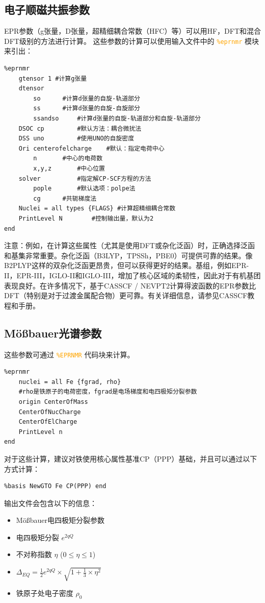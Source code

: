 \documentclass{ctexart}
\newcommand{\cmd}[1]{ \textcolor{orange}{\texttt{#1}} }
\begin{document}
	\subsection{电子顺磁共振参数} 
	EPR参数（g张量，D张量，超精细耦合常数（HFC）等）可以用HF，DFT和混合DFT级别的方法进行计算。
	这些参数的计算可以使用输入文件中的\cmd{\%eprnmr}模块来引出：
	\begin{lstlisting}
%eprnmr
	gtensor 1 #计算g张量
	dtensor 
		so		#计算d张量的自旋-轨道部分
		ss		#计算d张量的自旋-自旋部分 
		ssandso		#计算d张量的自旋-轨道部分和自旋-轨道部分
	DSOC cp 		#默认方法：耦合微扰法
	DSS uno 		#使用UNO的自旋密度
	Ori centerofelcharge	#默认：指定电荷中心
		n		#中心的电荷数
		x,y,z		#中心位置
	solver 			#指定解CP-SCF方程的方法 
		pople		#默认选项：polpe法
		cg		#共轭梯度法
	Nuclei = all types {FLAGS} #计算超精细耦合常数
	PrintLevel N    	#控制输出量，默认为2
end
	\end{lstlisting}
	
	注意：例如，在计算这些属性（尤其是使用DFT或杂化泛函）时，正确选择泛函和基集非常重要。杂化泛函（B3LYP，TPSSh，PBE0）可提供可靠的结果。像B2PLYP这样的双杂化泛函更昂贵，但可以获得更好的结果。基组，例如EPR-II，EPR-III，IGLO-II和IGLO-III，增加了核心区域的柔韧性，因此对于有机基团表现良好。在许多情况下，基于CASSCF / NEVPT2计算得波函数的EPR参数比DFT（特别是对于过渡金属配合物）更可靠。有关详细信息，请参见CASSCF教程和手册。
	
	\subsection{Mößbauer光谱参数} 
	
	这些参数可通过\cmd{\%EPRNMR}代码块来计算。
	\begin{lstlisting}
%eprnmr
	nuclei = all Fe {fgrad, rho}
	#rho是铁原子的电荷密度，fgrad是电场梯度和电四极矩分裂参数
	origin CenterOfMass
	CenterOfNucCharge
	CenterOfElCharge
	PrintLevel n 
end
	\end{lstlisting}
	
	对于这些计算，建议对铁使用核心属性基准CP（PPP）基础，并且可以通过以下方式计算：
	\begin{lstlisting}
%basis NewGTO Fe CP(PPP) end
	\end{lstlisting}
	输出文件会包含以下的信息：
	\begin{itemize}
	\item Mößbauer电四极矩分裂参数
	\item 电四极矩分裂 $e^{2qQ}$
	\item 不对称指数 $\eta$ ($0\leq\eta\leq1$) 
	\item $\Delta_{EQ}=\frac{1}{2}{e^{2qQ}}\times \sqrt{1+\frac{1}{3}\times\eta^{2}}$
	\item 铁原子处电子密度 $\rho_0$
	\end{itemize}
	
\end{document}
